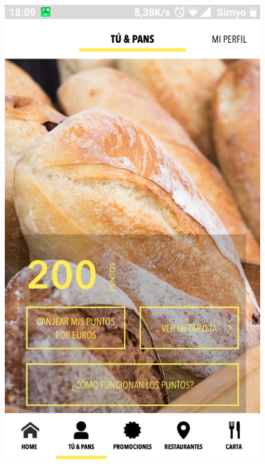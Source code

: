\documentclass[twoside]{report}
\begin{document}
\begin{figure}[H]
\begin{center}
\includegraphics[scale=0.25]{images/restaurantes/pans1.png}

\end{center}
\end{figure}
\end{document}
